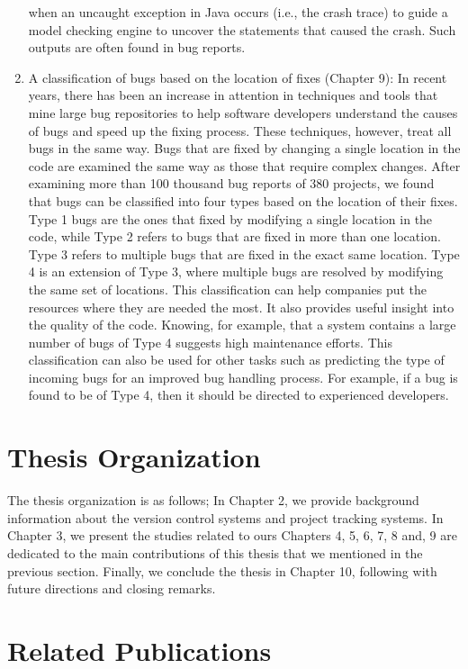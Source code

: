 \documentclass[12pt]{report}
\begin{document}
\begin{enumerate}
  when an uncaught exception in Java occurs (i.e., the crash trace) to
  guide a model checking engine to uncover the statements that caused
  the crash. Such outputs are often found in bug reports.
\item
  A classification of bugs based on the location of fixes (Chapter 9):
  In recent years, there has been an increase in attention in techniques
  and tools that mine large bug repositories to help software developers
  understand the causes of bugs and speed up the fixing process. These
  techniques, however, treat all bugs in the same way. Bugs that are
  fixed by changing a single location in the code are examined the same
  way as those that require complex changes. After examining more than
  100 thousand bug reports of 380 projects, we found that bugs can be
  classified into four types based on the location of their fixes. Type
  1 bugs are the ones that fixed by modifying a single location in the
  code, while Type 2 refers to bugs that are fixed in more than one
  location. Type 3 refers to multiple bugs that are fixed in the exact
  same location. Type 4 is an extension of Type 3, where multiple bugs
  are resolved by modifying the same set of locations. This
  classification can help companies put the resources where they are
  needed the most. It also provides useful insight into the quality of
  the code. Knowing, for example, that a system contains a large number
  of bugs of Type 4 suggests high maintenance efforts. This
  classification can also be used for other tasks such as predicting the
  type of incoming bugs for an improved bug handling process. For
  example, if a bug is found to be of Type 4, then it should be directed
  to experienced developers.
\end{enumerate}

\section{Thesis Organization}\label{thesis-organization}

The thesis organization is as follows; In Chapter 2, we provide
background information about the version control systems and project
tracking systems. In Chapter 3, we present the studies related to ours Chapters 4, 5, 6, 7, 8 and, 9 are
dedicated to the main contributions of this thesis that we mentioned in the
previous section. Finally, we conclude the thesis in Chapter 10, following with future directions and closing remarks.

\section{Related Publications}\label{related-publications}
\end{document}
